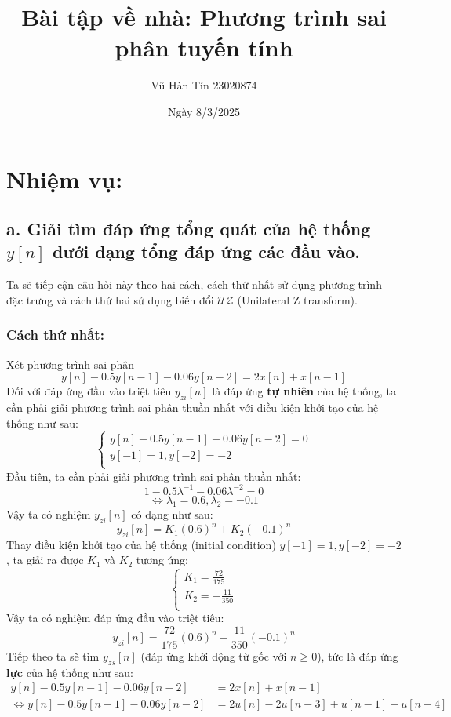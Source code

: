 \documentclass{article}
\title{Bài tập về nhà: Phương trình sai phân tuyến tính
}
\author{Vũ Hàn Tín 23020874}
\date{Ngày 8/3/2025}
\begin{document}
\maketitle
\section*{Nhiệm vụ:}
\subsection*{a. Giải tìm đáp ứng tổng quát của hệ thống $y[n]$ dưới dạng tổng đáp ứng các đầu vào.}
Ta sẽ tiếp cận câu hỏi này theo hai cách, cách thứ nhất sử dụng phương trình đặc trưng và cách thứ hai sử dụng biến đổi $\mathscr{UZ}$ (Unilateral Z transform).
\subsubsection*{Cách thứ nhất:}
Xét phương trình sai phân $$y[n]-0.5y[n-1]-0.06y[n-2]=2x[n]+x[n-1]$$
Đối với đáp ứng đầu vào triệt tiêu $y_{zi}[n]$ là đáp ứng \textbf{tự nhiên} của hệ thống, ta cần phải giải phương trình sai phân thuần nhất với điều kiện khởi tạo của hệ thống như sau:
\begin{equation*}
    \begin{cases} 
        y[n]-0.5y[n-1]-0.06y[n-2]=0 \\ 
        y[-1]=1, y[-2]=-2 \\
    \end{cases}
\end{equation*}
Đầu tiên, ta cần phải giải phương trình sai phân thuần nhất:
$$1-0.5\lambda^{-1}-0.06\lambda^{-2}=0$$
$$\Leftrightarrow \lambda_{1} = 0.6, \lambda_{2} = -0.1 $$
Vậy ta có nghiệm $y_{zi}[n]$ có dạng như sau:
$$y_{zi}[n]=K_{1}(0.6)^{n}+K_{2}(-0.1)^{n}$$
Thay điều kiện khởi tạo của hệ thống (initial condition) $y[-1]=1,y[-2]=-2$, ta giải ra được $K_{1}$ và $K_{2}$ tương ứng:
$$\begin{cases*}
    K_{1} = \frac{72}{175}  \\
    K_{2} = -\frac{11}{350} \\
\end{cases*}$$
Vậy ta có nghiệm đáp ứng đầu vào triệt tiêu: $$y_{zi}[n]=\frac{72}{175}(0.6)^{n}-\frac{11}{350}(-0.1)^{n}$$
Tiếp theo ta sẽ tìm $y_{zs}[n]$ (đáp ứng khởi dộng từ gốc với $n\geq0$), tức là đáp ứng \textbf{lực} của hệ thống như sau:
\begin{equation*}
\begin{split}
    y[n]-0.5y[n-1]-0.06y[n-2]&=2x[n]+x[n-1] \\ \Leftrightarrow y[n]-0.5y[n-1]-0.06y[n-2]&=2u[n]-2u[n-3]+u[n-1]-u[n-4]
\end{split}
\end{equation*}
\end{document}

